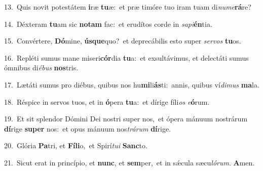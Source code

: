 {\numbfont\textcolor{\numbcolor}{13.}}~Quis novit potestátem \textbf{i}\-ræ \textbf{tu}\-æ:~\star et præ timóre tuo iram tuam di\-\textit{nu}\-\textit{me}\textbf{rá}re?\par
{\numbfont\textcolor{\numbcolor}{14.}}~Déxteram \textbf{tu}\-am sic \textbf{no}\-\textbf{tam} fac:~\star et erudítos corde in \textit{sa}\-\textit{pi}\textbf{én}tia.\par
{\numbfont\textcolor{\numbcolor}{15.}}~Convértere, \textbf{Dó}\-mine, \textbf{ús}\-\textbf{que}quo?~\star et deprecábilis esto super \textit{ser}\-\textit{vos} \textbf{tu}\-os.\par
{\numbfont\textcolor{\numbcolor}{16.}}~Repléti sumus mane miseri\-\textbf{cór}\-dia \textbf{tu}\-a:~\star et exsultávimus, et delectáti sumus ómnibus di\-\textit{é}\-\textit{bus} \textbf{nos}\-tris.\par
{\numbfont\textcolor{\numbcolor}{17.}}~Lætáti sumus pro diébus, quibus nos hu\-\textbf{mi}\-li\-\textbf{ás}\-ti:~\star annis, quibus ví\-\textit{di}\-\textit{mus} \textbf{ma}\-la.\par
{\numbfont\textcolor{\numbcolor}{18.}}~Réspice in servos tuos, et in \textbf{ó}\-pera \textbf{tu}\-a:~\star et dírige fíli\textit{os} \textit{e}\-\textbf{ó}rum.\par
{\numbfont\textcolor{\numbcolor}{19.}}~Et sit splendor Dómini Dei nostri super nos,~\dagger et ópera mánuum nostrárum \textbf{dí}\-rige \textbf{su}\-\textbf{per} nos:~\star et opus mánuum nos\-\textit{trá}\-\textit{rum} \textbf{dí}\-rige.\par
{\numbfont\textcolor{\numbcolor}{20.}}~Glória \textbf{Pa}\-tri, et \textbf{Fí}\-\textbf{li}o,~\star et Spirí\-\textit{tu}\-\textit{i} \textbf{Sanc}\-to.\par
{\numbfont\textcolor{\numbcolor}{21.}}~Sicut erat in princípio, et \textbf{nunc}\-, et \textbf{sem}\-per,~\star et in sǽcula sæcu\-\textit{ló}\-\textit{rum}. \textbf{A}\-men.\par
